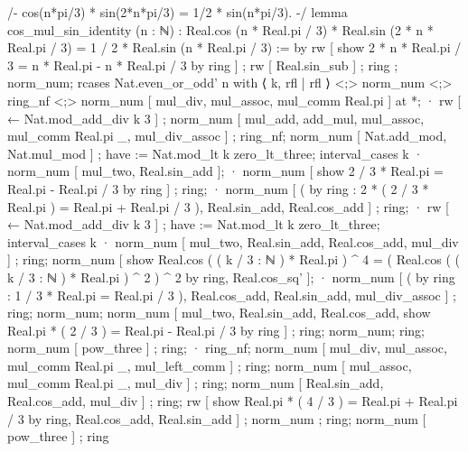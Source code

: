 /-
cos(n*pi/3) * sin(2*n*pi/3) = 1/2 * sin(n*pi/3).
-/
lemma cos_mul_sin_identity (n : ℕ) : Real.cos (n * Real.pi / 3) * Real.sin (2 * n * Real.pi / 3) = 1 / 2 * Real.sin (n * Real.pi / 3) := by
  rw [ show 2 * n * Real.pi / 3 = n * Real.pi - n * Real.pi / 3 by ring ] ; rw [ Real.sin_sub ] ; ring ; norm_num;
  rcases Nat.even_or_odd' n with ⟨ k, rfl | rfl ⟩ <;> norm_num <;> ring_nf <;> norm_num [ mul_div, mul_assoc, mul_comm Real.pi ] at *;
  · rw [ ← Nat.mod_add_div k 3 ] ; norm_num [ mul_add, add_mul, mul_assoc, mul_comm Real.pi _, mul_div_assoc ] ; ring_nf; norm_num [ Nat.add_mod, Nat.mul_mod ] ;
    have := Nat.mod_lt k zero_lt_three; interval_cases k %
    · norm_num [ mul_two, Real.sin_add ];
    · norm_num [ show 2 / 3 * Real.pi = Real.pi - Real.pi / 3 by ring ] ; ring;
    · norm_num [ ( by ring : 2 * ( 2 / 3 * Real.pi ) = Real.pi + Real.pi / 3 ), Real.sin_add, Real.cos_add ] ; ring;
  · rw [ ← Nat.mod_add_div k 3 ] ; have := Nat.mod_lt k zero_lt_three; interval_cases k %
    · norm_num [ mul_two, Real.sin_add, Real.cos_add, mul_div ] ; ring;
      norm_num [ show Real.cos ( ( k / 3 : ℕ ) * Real.pi ) ^ 4 = ( Real.cos ( ( k / 3 : ℕ ) * Real.pi ) ^ 2 ) ^ 2 by ring, Real.cos_sq' ];
    · norm_num [ ( by ring : 1 / 3 * Real.pi = Real.pi / 3 ), Real.cos_add, Real.sin_add, mul_div_assoc ] ; ring; norm_num;
      norm_num [ mul_two, Real.sin_add, Real.cos_add, show Real.pi * ( 2 / 3 ) = Real.pi - Real.pi / 3 by ring ] ; ring; norm_num; ring;
      norm_num [ pow_three ] ; ring;
    · ring_nf; norm_num [ mul_div, mul_assoc, mul_comm Real.pi _, mul_left_comm ] ; ring;
      norm_num [ mul_assoc, mul_comm Real.pi _, mul_div ] ; ring; norm_num [ Real.sin_add, Real.cos_add, mul_div ] ; ring;
      rw [ show Real.pi * ( 4 / 3 ) = Real.pi + Real.pi / 3 by ring, Real.cos_add, Real.sin_add ] ; norm_num ; ring;
      norm_num [ pow_three ] ; ring

